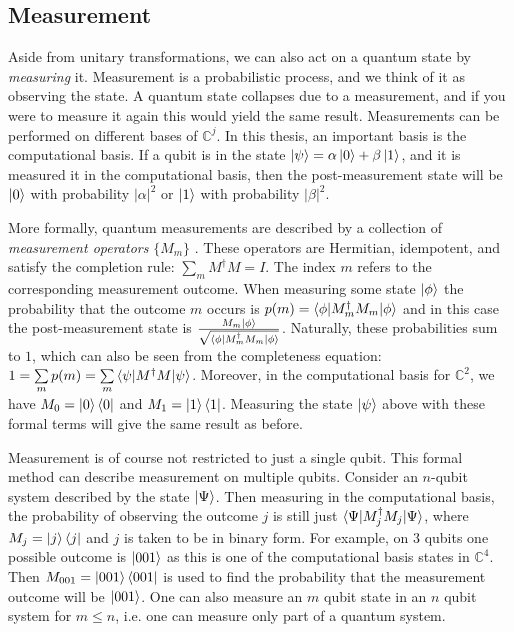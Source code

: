 \documentclass[12pt]{dalthesis}
\begin{document}
\subsection{Measurement}
Aside from unitary transformations, we can also act on a quantum state by \emph{measuring} it. Measurement is a probabilistic process, and we think of it as observing the state. A quantum state collapses due to a measurement, and if you were to measure it again this would yield the same result. Measurements can be performed on different bases of $\mathbb{C}^j$. In this thesis, an important basis is the computational basis. If a qubit is in the state $\ket{\psi} = \alpha \ket{0} + \beta \ket{1}$, and it is measured it in the computational basis, then the post-measurement state will be $\ket{0}$ with probability $|\alpha |^2$ or $\ket{1}$ with probability $|\beta |^2$. 

More formally, quantum measurements are described by a collection of \emph{measurement operators} $\{ M_m \}$ \cite{nielsen00}. These operators are Hermitian, idempotent, and satisfy the completion rule: $\sum\limits_{m} M^{\dag}M = I$. The index $m$ refers to the corresponding measurement outcome. When measuring some state $\ket{\phi}$ the probability that the outcome $m$ occurs is $p(m) = \braket{\phi | M^{\dag}_m M_m | \phi}$ and in this case the post-measurement state is $\frac{M_m \ket{\phi}}{\sqrt{\braket{\phi | M^{\dag}_m M_m | \phi}}}$. Naturally, these probabilities sum to $1$, which can also be seen from the completeness equation: $1 = \sum\limits_{m} p(m) = \sum\limits_{m} \braket{\psi |M^{\dag}M| \psi}$. Moreover, in the computational basis for $\mathbb{C}^2$, we have $M_0 = \ket{0} \bra{0}$ and $M_1 = \ket{1} \bra{1}$. Measuring the state $\ket{\psi}$ above with these formal terms will give the same result as before. 

Measurement is of course not restricted to just a single qubit. This formal method can describe measurement on multiple qubits. Consider an $n$-qubit system described by the state $\ket{\Psi}$. Then measuring in the computational basis, the probability of observing the outcome $j$ is still just $\braket{\Psi | M^{\dag}_j M_j | \Psi}$, where $M_j = \ket{j} \bra{j}$ and $j$ is taken to be in binary form. For example, on $3$ qubits one possible outcome is $\ket{001}$ as this is one of the computational basis states in $\mathbb{C}^4$. Then $M_{001} = \ket{001}\bra{001}$ is used to find the probability that the measurement outcome will be $\ket{001}$. One can also measure an $m$ qubit state in an $n$ qubit system for $m \leq n$, i.e. one can measure only part of a quantum system.
\end{document}
